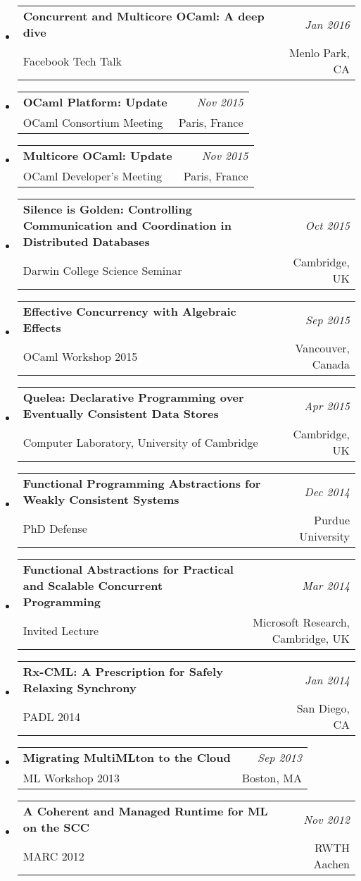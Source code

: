 \documentclass[10pt]{article}
\makeatletter
\newcommand{\lbar}[1]{{\color{#1}\ding{118}}\hspace*{2pt}}
\newenvironment{talk}[4]
{ \item
  \begin{tabular*}{7.5in}{l@{\extracolsep{\fill}}r}
    \textbf{#1} & \textit{#2} \\
		\hspace{1ex} #3 & \small{#4}
\end{tabular*}
} {}
\newenvironment{itemregion}[1]{
	\vspace*{0.5ex}
	{\scalebox{1.4}{\textbf{#1}}}
	\begin{itemize}\itemsep1pt}
	{\end{itemize}\vspace{0.8ex}}
\makeatother
\begin{document}
\begin{itemregion}{\lbar{blue}Talks}
	\begin{talk} {Concurrent and Multicore OCaml: A deep dive}
		{Jan 2016} {Facebook Tech Talk} {Menlo Park, CA}
	\end{talk}

	\begin{talk} {OCaml Platform: Update}
		{Nov 2015}{OCaml Consortium Meeting}{Paris, France}
	\end{talk}

	\begin{talk} {Multicore OCaml: Update}
		{Nov 2015}{OCaml Developer's Meeting}{Paris, France}
	\end{talk}

	\begin{talk} {Silence is Golden: Controlling Communication and Coordination in Distributed Databases}
		{Oct 2015}{Darwin College Science Seminar}{Cambridge, UK}
	\end{talk}

	\begin{talk} {Effective Concurrency with Algebraic Effects}
		{Sep 2015}{OCaml Workshop 2015}{Vancouver, Canada}
	\end{talk}

	\begin{talk} {Quelea: Declarative Programming over Eventually Consistent Data Stores}
		{Apr 2015}{Computer Laboratory, University of Cambridge} {Cambridge, UK}
	\end{talk}

	\begin{talk} {Functional Programming Abstractions for Weakly Consistent Systems}
	  {Dec 2014}{PhD Defense}{Purdue University}
	\end{talk}

	\begin{talk} {Functional Abstractions for Practical and Scalable Concurrent Programming}
		{Mar 2014}{Invited Lecture}{Microsoft Research, Cambridge, UK}
	\end{talk}

	\begin{talk}{Rx-CML: A Prescription for Safely Relaxing Synchrony}
		{Jan 2014}{PADL 2014}{San Diego, CA}
	\end{talk}

	\begin{talk}{Migrating MultiMLton to the Cloud}
		{Sep 2013}{ML Workshop 2013}{Boston, MA}
	\end{talk}

	\begin{talk}{A Coherent and Managed Runtime for ML on the SCC}
		{Nov 2012}{MARC 2012}{RWTH Aachen}
	\end{talk}


\end{itemregion}
\end{document}
